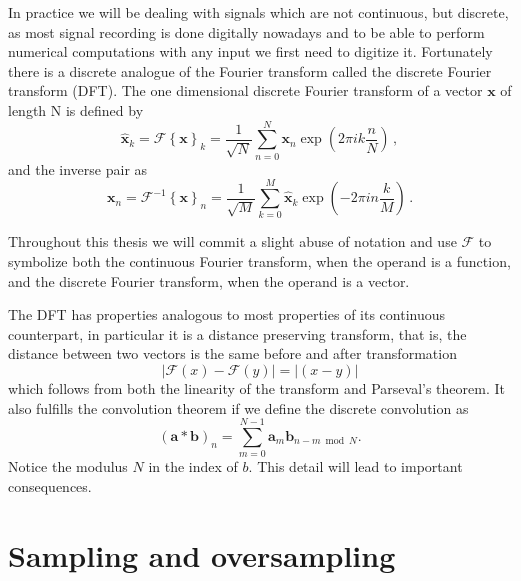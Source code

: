 In practice we will be dealing with signals which are not continuous, but
discrete, as most signal recording is done digitally nowadays and to be able to
perform numerical computations with any input we first need to digitize
it. Fortunately there is a discrete analogue of the Fourier transform called
the discrete Fourier transform (DFT). The one dimensional discrete Fourier
transform of a vector $\mathbf x$ of length N is defined by
\begin{equation}
\hat{\mathbf x}_k = \mathscr{F}\left\{ \mathbf x\right\}_k = \frac{1}{\sqrt{N}} \sum
\limits_{n=0}^{N} \mathbf x_n \exp\left(2 \pi i k \frac{n}{N}\right) \, ,
\end{equation}
and the inverse pair as
\begin{equation}
{\mathbf x}_n = \mathscr{F}^{-1}\left\{ \mathbf x\right\}_n = \frac{1}{\sqrt{M}} \sum
\limits_{k=0}^{M} \hat{\mathbf x}_k \exp\left(-2 \pi i n \frac{k}{M}\right) \, .
\end{equation}

Throughout this thesis we will commit a slight abuse of notation and use
$\mathscr{F}$ to symbolize both the continuous Fourier transform, when the
operand is a function, and the discrete Fourier transform, when the operand is a
vector.
 
The DFT has properties analogous to most properties of its continuous
counterpart, in particular it is a distance preserving transform, that is, the distance between two vectors is the same before and after transformation
\begin{equation}
  |\mathscr{F}(x)-\mathscr{F}(y)| = |(x-y)|
\end{equation}
which follows from both the linearity of the transform and Parseval's theorem.
It also fulfills the convolution theorem if we define the discrete
convolution as
\begin{equation}
  (\mathbf a * \mathbf b)_n = \sum \limits_{m = 0}^{N-1} \mathbf a_m 
  \mathbf  b_{n-m \bmod N} .
  \label{Eq:dft_convolution}
\end{equation}
Notice the modulus $N$ in the index of $b$. This detail will lead to important
consequences.

\section{Sampling and oversampling}


